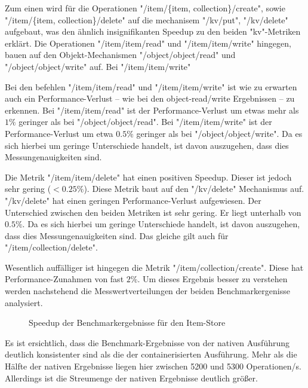 Zum einen wird für die Operationen "/item/\{item, collection\}/create", sowie "/item/\{item, collection\}/delete" auf die mechanisem "/kv/put", "/kv/delete" aufgebaut, was den ähnlich insignifikanten Speedup zu den beiden "kv"-Metriken erklärt. 
Die Operationen "/item/item/read" und "/item/item/write" hingegen, bauen auf den Objekt-Mechanismen "/object/object/read" und "/object/object/write" auf. Bei "/item/item/write"

Bei den befehlen "/item/item/read" und "/item/item/write" ist wie zu erwarten auch ein Performance-Verlust – wie bei den object-read/write Ergebnissen – zu erkennen. Bei "/item/item/read" ist der Performance-Verlust um etwas mehr als $1\%$ geringer als bei "/object/object/read". Bei "/item/item/write" ist der Performance-Verlust um etwa $0.5\%$ geringer als bei "/object/object/write". Da es sich hierbei um geringe Unterschiede handelt, ist davon auszugehen, dass dies Messungenauigkeiten sind. 

Die Metrik "/item/item/delete" hat einen positiven Speedup. Dieser ist jedoch sehr gering ($<0.25\%$). Diese Metrik baut auf den "/kv/delete" Mechanismus auf. "/kv/delete" hat einen geringen Performance-Verlust aufgewiesen. Der Unterschied zwischen den beiden Metriken ist sehr gering. Er liegt unterhalb von $0.5\%$. Da es sich hierbei um geringe Unterschiede handelt, ist davon auszugehen, dass dies Messungenauigkeiten sind. Das gleiche gilt auch für "/item/collection/delete".

Wesentlich auffälliger ist hingegen die Metrik "/item/collection/create". Diese hat Performance-Zunahmen von fast $2\%$. Um dieses Ergebnis besser zu verstehen werden nachstehend die Messwertverteilungen der beiden Benchmarkergenisse analysiert. 

\begin{figure}
    \centering
    
    \caption{Speedup der Benchmarkergebnisse für den Item-Store}
    \label{fig:speedup_item}
\end{figure}

\FloatBarrier

Es ist ersichtlich, dass die Benchmark-Ergebnisse von der nativen Ausführung deutlich konsistenter sind als die der containerisierten Ausführung. Mehr als die Hälfte der nativen Ergebnisse liegen hier zwischen 5200 und 5300 Operationen/s. Allerdings ist die Streumenge der nativen Ergebnisse deutlich größer. 

